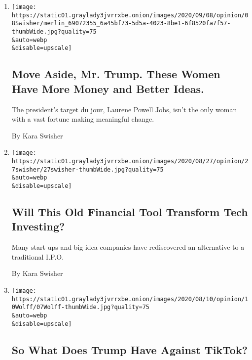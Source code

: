 \begin{enumerate}
\def\labelenumi{\arabic{enumi}.}
\item
  \href{/2020/09/08/opinion/trump-powell-jobs-atlantic.html}{}

  \texttt{[image: https://static01.graylady3jvrrxbe.onion/images/2020/09/08/opinion/08Swisher/merlin\_69072355\_6a45bf73-5d5a-4023-8be1-6f8520fa7f57-thumbWide.jpg?quality=75\\\&auto=webp\\\&disable=upscale]}

  \hypertarget{move-aside-mr-trump-these-women-have-more-money-and-better-ideas}{%
  \subsection{Move Aside, Mr. Trump. These Women Have More Money and
  Better
  Ideas.}\label{move-aside-mr-trump-these-women-have-more-money-and-better-ideas}}

  The president's target du jour, Laurene Powell Jobs, isn't the only
  woman with a vast fortune making meaningful change.

  By Kara Swisher
\item
  \href{/2020/08/28/opinion/SPAC-tech-investing.html}{}

  \texttt{[image: https://static01.graylady3jvrrxbe.onion/images/2020/08/27/opinion/27swisher/27swisher-thumbWide.jpg?quality=75\\\&auto=webp\\\&disable=upscale]}

  \hypertarget{will-this-old-financial-tool-transform-tech-investing}{%
  \subsection{Will This Old Financial Tool Transform Tech
  Investing?}\label{will-this-old-financial-tool-transform-tech-investing}}

  Many start-ups and big-idea companies have rediscovered an alternative
  to a traditional I.P.O.

  By Kara Swisher
\item
  \href{/2020/08/07/opinion/tiktok-wechat-china-trump-executive-order.html}{}

  \texttt{[image: https://static01.graylady3jvrrxbe.onion/images/2020/08/10/opinion/10Wolff/07Wolff-thumbWide.jpg?quality=75\\\&auto=webp\\\&disable=upscale]}

  \hypertarget{so-what-does-trump-have-against-tiktok}{%
  \subsection{So What Does Trump Have Against
  TikTok?}\label{so-what-does-trump-have-against-tiktok}}


\end{enumerate}
